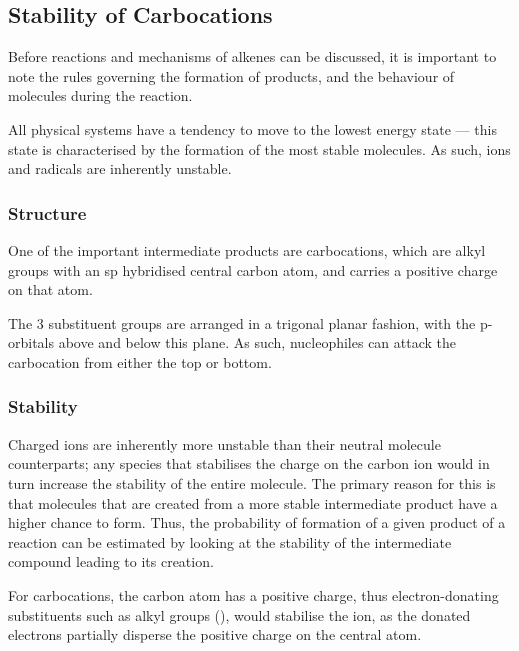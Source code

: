 \pagebreak
\subsection{Stability of Carbocations}

	Before reactions and mechanisms of alkenes can be discussed, it is important to note the rules governing the formation
	of products, and the behaviour of molecules during the reaction.

	All physical systems have a tendency to move to the lowest energy state –– this state is characterised by the formation
	of the most stable molecules. As such, ions and radicals are inherently unstable.

	\subsubsection{Structure}

		One of the important intermediate products are carbocations, which are alkyl groups with an sp hybridised
		central carbon atom, and carries a positive charge on that atom.


		The 3 substituent groups are arranged in a trigonal planar fashion, with the p-orbitals above and below this
		plane. As such, nucleophiles can attack the carbocation from either the top or bottom.



	\subsubsection{Stability}

		Charged ions are inherently more unstable than their neutral molecule counterparts; any species that stabilises
		the charge on the carbon ion would in turn increase the stability of the entire molecule. The primary reason for
		this is that molecules that are created from a more stable intermediate product have a higher chance to form. Thus,
		the probability of formation of a given product of a reaction can be estimated by looking at the stability of
		the intermediate compound leading to its creation.

		For carbocations, the carbon atom has a positive charge, thus electron-donating substituents such as alkyl
		groups (), would stabilise the ion, as the donated electrons partially disperse the positive charge on the
		central atom.

